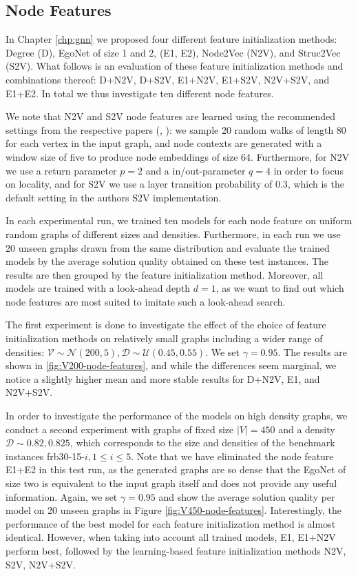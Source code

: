 \documentclass[draft,final]{vutinfth} %
\begin{document}
\subsection{Node Features}
In Chapter \ref{chp:gnn} we proposed four different feature initialization methods: Degree (D), EgoNet of size 1 and 2, (E1, E2), Node2Vec (N2V), and Struc2Vec (S2V). What follows is an evaluation of these feature initialization methods and combinations thereof: D+N2V, D+S2V, E1+N2V, E1+S2V, N2V+S2V, and E1+E2. In total we thus investigate ten different node features. 

We note that N2V and S2V node features are learned using the recommended settings from the respective papers (\cite{GroverL16}, \cite{FigueiredoRS17}): we sample 20 random walks of length 80 for each vertex in the input graph, and node contexts are generated with a window size of five to produce node embeddings of size 64. Furthermore, for N2V we use a return parameter $p=2$ and a in/out-parameter $q=4$ in order to focus on locality, and for S2V we use a layer transition probability of $0.3$, which is the default setting in the authors S2V implementation. 

In each experimental run, we trained ten models for each node feature on uniform random graphs of different sizes and densities. 
Furthermore, in each run we use 20 unseen graphs drawn from the same distribution and evaluate the trained models by the average solution quality obtained on these test instances. The results are then grouped by the feature initialization method. 
Moreover, all models are trained with a look-ahead depth $d=1$, as we want to find out which node features are most suited to imitate such a look-ahead search. 

The first experiment is done to investigate the effect of the choice of feature initialization methods on relatively small graphs including a wider range of densities: $\mathcal{V} \sim \mathcal{N}(200, 5), \mathcal{D} \sim \mathcal{U}(0.45, 0.55)$. We set $\gamma=0.95$. The results are shown in \ref{fig:V200-node-features}, and while the differences seem marginal, we notice a slightly higher mean and more stable results for D+N2V, E1, and N2V+S2V. 

In order to investigate the performance of the models on high density graphs, we conduct a second experiment with graphs of fixed size $|V|=450$ and a density $\mathcal{D} \sim \mathcal{0.82, 0.825}$, which corresponds to the size and densities of the benchmark instances frb30-15-$i, 1\leq i \leq 5$. 
Note that we have eliminated the node feature E1+E2 in this test run, as the generated graphs are so dense that the EgoNet of size two is equivalent to the input graph itself and does not provide any useful information. 
Again, we set $\gamma=0.95$ and show the average solution quality per model on 20 unseen graphs in Figure \ref{fig:V450-node-features}. 
Interestingly, the performance of the best model for each feature initialization method is almost identical. 
However, when taking into account all trained models, E1, E1+N2V perform best, followed by the learning-based feature initialization methods N2V, S2V, N2V+S2V. 
\end{document}
